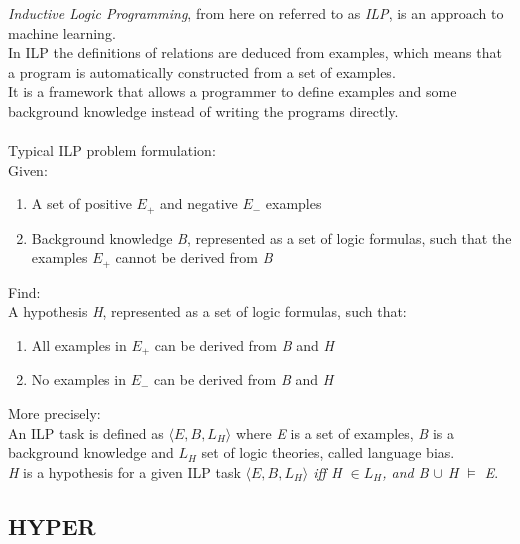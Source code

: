 \documentclass[11pt]{article}
\begin{document}
\emph{Inductive Logic Programming}, from here on referred to as \emph{ILP}, is an approach to machine learning.\\
In ILP the definitions of relations are deduced from examples, which means that a program is automatically constructed from a set of examples.\\
It is a framework that allows a programmer to define examples and some background knowledge instead of writing the programs directly.\\\\
Typical ILP problem formulation:\\Given:
\begin{enumerate}
\item A set of positive \emph{$E_+$} and negative \emph{$E_-$} examples
\item Background knowledge \emph{B}, represented as a set of logic formulas, such that the examples \emph{$E_+$} cannot be derived from \emph{B}
\end{enumerate}
Find:\\
A hypothesis \emph{H}, represented as a set of logic formulas, such that:
\begin{enumerate}
\item All examples in \emph{$E_+$} can be derived from \emph{B} and \emph{H}
\item No examples in \emph{$E_-$} can be derived from \emph{B} and \emph{H}
\end{enumerate}
More precisely:
\\
An ILP task is defined as \emph{$\langle E, B, L_H\rangle$} where \emph{E} is a set of examples, \emph{B} is a background knowledge and \emph{$L_H$} set of logic theories, called language bias.\\
\emph{H} is a hypothesis for a given ILP task \emph{$\langle E, B, L_H\rangle$ iff H $\in L_H$, and B $\cup$ H $\models$ E}. 

\subsection{HYPER}
\end{document}

